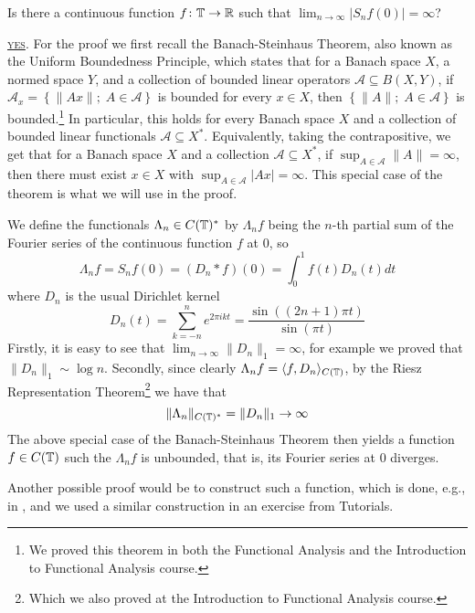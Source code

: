 \documentclass[a4paper, 12pt]{article}
\begin{document}
\begin{Exercise}
    Is there a continuous function $f \colon \mathbb{T} \to \mathbb{R}$ such that
    $\lim_{n\to\infty}|S_nf(0)| = \infty$?

    \underline{\textsc{yes}}.
    For the proof we first recall the Banach-Steinhaus Theorem, also known as
    the Uniform Boundedness Principle, which states that for a Banach space
    $X$, a normed space $Y$, and a collection of bounded linear operators
    $\mathcal{A} \subseteq B(X, Y)$, if $\mathcal{A}_x = \left\{ \| Ax \| ; \;
    A \in \mathcal{A} \right\}$ is bounded for every $x \in X$, then $\left\{
        \| A \| ; \; A \in \mathcal{A} \right\}$ is bounded.\footnote{We proved
    this theorem in both the Functional Analysis and the Introduction to
    Functional Analysis course.} In particular, this holds for every Banach
    space $X$ and a collection of bounded linear functionals $\mathcal{A}
    \subseteq X^*$.  Equivalently, taking the contrapositive, we get that for a
    Banach space $X$ and a collection $\mathcal{A} \subseteq X^*$, if $\sup_{A
    \in \mathcal{A}} \| A \| = \infty$, then there must exist $x \in X$ with
    $\sup_{A \in \mathcal{A}} |Ax| = \infty$.  This special case of the theorem
    is what we will use in the proof.

    We define the functionals $\Lambda_n \in C(\mathbb{T})^*$ by $\Lambda_n f$ being the $n$-th partial sum of the Fourier series of the continuous function $f$ at $0$, so
    \[
        \Lambda_n f
        = S_n f (0)
        = (D_n * f) (0)
        = \int_{0}^{1} f(t)D_n(t) dt
    \]
    where $D_n$ is the usual Dirichlet kernel
    \[
        D_n(t)
        = \sum_{k = -n}^{n} e^{2\pi i k t}
        = \frac{\sin((2n + 1)\pi t)}{\sin(\pi t)}
    \]
    Firstly, it is easy to see that $\lim_{n \to \infty}\| D_n \|_1 = \infty$,
    for example we proved that $\| D_n \|_1 \sim \log n$.
    Secondly, since clearly $\Lambda_n f = \langle f, D_n \rangle_{C(\mathbb{T})}$,
    by the Riesz Representation Theorem\footnote{Which we also proved at the Introduction to Functional Analysis course.}
    we have that
    \[
        \| \Lambda_n \|_{C(\mathbb{T})^*} = \| D_n \|_1 \to \infty
    \]
    The above special case of the Banach-Steinhaus Theorem then yields a function $f \in C(\mathbb{T})$ such the $\Lambda_n f$ is unbounded,
    that is, its Fourier series at $0$ diverges.

    Another possible proof would be to construct such a function, which is done, e.g., in \cite[Vol. I, p.\ 299]{Zygmund2002},
    and we used a similar construction in an exercise from Tutorials.
\end{Exercise}
\end{document}
